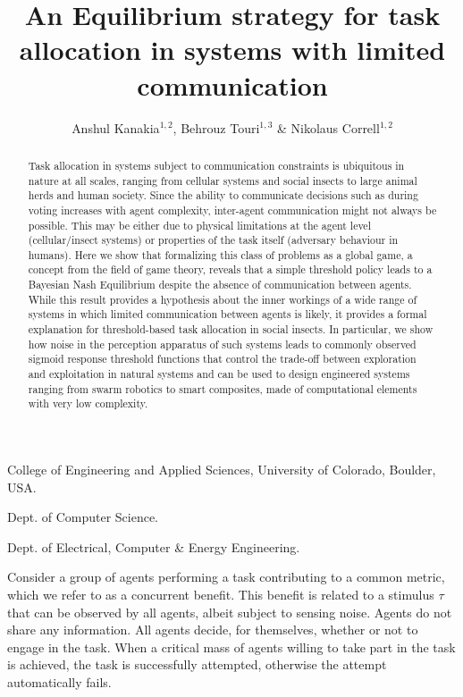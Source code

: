 \documentclass{nature}
\title{An Equilibrium strategy for task allocation in systems with limited communication}
\author{Anshul Kanakia$^{1,2}$, Behrouz Touri$^{1,3}$ \& Nikolaus Correll$^{1,2}$}
\begin{document}
\maketitle
\begin{affiliations}
 \item College of Engineering and Applied Sciences, University of Colorado, Boulder, USA. 
 \item Dept. of Computer Science.
 \item Dept. of Electrical, Computer \& Energy Engineering.
\end{affiliations}

\linenumbers
\begin{abstract}
Task allocation in systems subject to communication constraints is ubiquitous in nature at all scales, ranging from cellular systems\cite{Yoshida2010, Suzuki2015} and social insects\cite{Robinson1987, Gordon1996, Bonabeau1998, Theraulaz1998} to large animal herds\cite{Conradt2003, Conradt2005} and human society\cite{Raafat2009}. Since the ability to communicate decisions such as during voting\cite{Conradt2003} increases with agent complexity, inter-agent communication might not always be possible. This may be either due to physical limitations at the agent level (cellular/insect systems) or properties of the task itself (adversary behaviour in humans). Here we show that formalizing this class of problems as a global game, a concept from the field of game theory, reveals that a simple threshold policy leads to a Bayesian Nash Equilibrium despite the absence of communication between agents. While this result provides a hypothesis about the inner workings of a wide range of systems in which limited communication between agents is likely, it provides a formal explanation for threshold-based task allocation in social insects. In particular, we show how noise in the perception apparatus of such systems leads to commonly observed sigmoid response threshold functions that control the trade-off between exploration and exploitation\cite{Bonabeau1997} in natural systems and can be used to design engineered systems ranging from swarm robotics\cite{Martinoli1999, Krieger2000, Kube2000, Mataric2003, Gerkey2004} to smart composites\cite{McEvoy2015}, made of computational elements with very low complexity. 
\end{abstract}

Consider a group of agents performing a task contributing to a common metric, which we refer to as a concurrent benefit. This benefit is related to a stimulus $\tau$ that can be observed by all agents, albeit subject to sensing noise. Agents do not share any information. All agents decide, for themselves, whether or not to engage in the task. When a critical mass of agents willing to take part in the task is achieved, the task is successfully attempted, otherwise the attempt automatically fails. 
\end{document}
